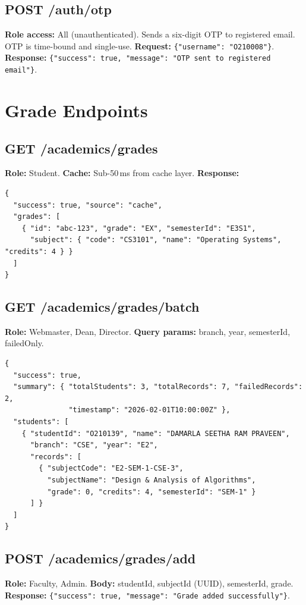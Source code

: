 \documentclass[12pt,a4paper]{report}
\newcommand{\code}[1]{\texttt{#1}}
\begin{document}
\subsection{POST /auth/otp}

\textbf{Role access:} All (unauthenticated). Sends a six-digit OTP to registered email. OTP is time-bound and single-use. \textbf{Request:} \code{\{"username": "O210008"\}}. \textbf{Response:} \code{\{"success": true, "message": "OTP sent to registered email"\}}.

\section{Grade Endpoints}

\subsection{GET /academics/grades}
\textbf{Role:} Student. \textbf{Cache:} Sub-50\,ms from cache layer. \textbf{Response:}
\begin{lstlisting}[caption={Student grades},label={lst:grades}]
{
  "success": true, "source": "cache",
  "grades": [
    { "id": "abc-123", "grade": "EX", "semesterId": "E3S1",
      "subject": { "code": "CS3101", "name": "Operating Systems", "credits": 4 } }
  ]
}
\end{lstlisting}

\subsection{GET /academics/grades/batch}
\textbf{Role:} Webmaster, Dean, Director. \textbf{Query params:} branch, year, semesterId, failedOnly.
\begin{lstlisting}[caption={Batch grades response},label={lst:batchgrades}]
{
  "success": true,
  "summary": { "totalStudents": 3, "totalRecords": 7, "failedRecords": 2,
               "timestamp": "2026-02-01T10:00:00Z" },
  "students": [
    { "studentId": "O210139", "name": "DAMARLA SEETHA RAM PRAVEEN",
      "branch": "CSE", "year": "E2",
      "records": [
        { "subjectCode": "E2-SEM-1-CSE-3",
          "subjectName": "Design & Analysis of Algorithms",
          "grade": 0, "credits": 4, "semesterId": "SEM-1" }
      ] }
  ]
}
\end{lstlisting}

\subsection{POST /academics/grades/add}
\textbf{Role:} Faculty, Admin. \textbf{Body:} studentId, subjectId (UUID), semesterId, grade. \textbf{Response:} \code{\{"success": true, "message": "Grade added successfully"\}}.
\end{document}
